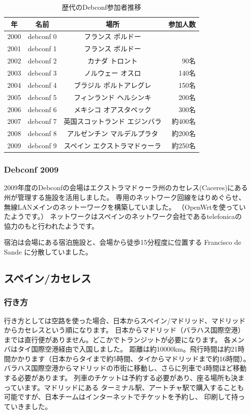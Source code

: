 \documentclass[mingoth,a4paper]{jsarticle}
\begin{document}
\begin{table}[H]
\caption{歴代のDebconf参加者推移}
\label{tab:debconflist}
 \begin{center}
 {\footnotesize
 \begin{tabular}{|c|c|c|r|}
 \hline
 年 & 名前 & 場所 & 参加人数 \\
 \hline
 2000 & debconf 0 &フランス ボルドー & \\
 2001 & debconf 1 &フランス ボルドー & \\
 2002 & debconf 2 &カナダ トロント & 90名 \\
 2003 & debconf 3 &ノルウェー オスロ & 140名 \\
 2004 & debconf 4 &ブラジル ポルトアレグレ &  150名 \\
 2005 & debconf 5 &フィンランド ヘルシンキ & 200名 \\
 2006 & debconf 6 &メキシコ オアスタペック & 300名 \\
 2007 & debconf 7 &英国スコットランド エジンバラ & 約400名 \\
 2008 & debconf 8 &アルゼンチン マルデルプラタ & 約200名 \\               
 2009 & debconf 9 &スペイン エクストラマドゥーラ & 約250名 \\
 \hline
 \end{tabular}
 }
 \end{center}
\end{table}

\subsubsection{Debconf 2009}

2009年度のDebconfの会場はエクストラマドゥーラ州のカセレス(Caceres)にある
州が管理する施設を活用しました。
専用のネットワーク回線をはりめぐらせ、無線LANメインのネットーワークを構築していました。
（OpenWrtを使っていたようです。）
ネットワークはスペインのネットワーク会社であるtelefonicaの
協力のもと行われたようです。

宿泊は会場にある宿泊施設と、会場から徒歩15分程度に位置する Francisco de Sande に分散していました。

\subsection{スペイン/カセレス}

\subsubsection{行き方}
  行き方としては空路を使った場合、日本からスペイン/マドリッド、マドリッドからカセレスという順になります。
  日本からマドリッド（バラハス国際空港）までは直行便がありません。どこかでトランジットが必要になります。
  各メンバはタイ国際空港経由で入国しました。
  距離は約10000km。飛行時間は約21時間かかります（日本からタイまで約5時間、タイからマドリッドまで約16時間）。
  バラハス国際空港からマドリッドの市街に移動し、さらに列車で4時間ほど移動する必要があります。
  列車のチケットは予約する必要があり、座る場所も決まっています。マドリッドにある
  ターミナル駅、アートチャ駅で購入することも可能ですが、日本チームはインターネットでチケットを予約し、
  印刷して持っていきました。
\end{document}
